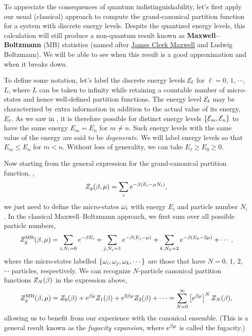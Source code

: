 To appreciate the consequences of quantum indistinguishability, let's first apply our usual (classical) approach to compute the grand-canonical partition function for a system with discrete energy levels.
Despite the quantized energy levels, this calculation will still produce a non-quantum result known as \textbf{Maxwell--Boltzmann} (MB) statistics (named after \href{https://en.wikipedia.org/wiki/James_Clerk_Maxwell}{James Clerk Maxwell} and Ludwig Boltzmann).
We will be able to see when this result is a good approximation and when it breaks down.

To define some notation, let's label the discrete energy levels $\mathcal E_{\ell}$ for $\ell = 0$, $1$, $\cdots$, $L$, where $L$ can be taken to infinity while retaining a countable number of micro-states and hence well-defined partition functions.
The energy level $\mathcal E_{\ell}$ may be characterized by extra information in addition to the actual value of its energy, $E_{\ell}$.
As we saw in , it is therefore possible for distinct energy levels $\left\{\mathcal E_m, \mathcal E_n\right\}$ to have the same energy $E_m = E_n$ for $m \neq n$.
Such energy levels with the same value of the energy are said to be \textit{degenerate}.
We will label energy levels so that $E_m \leq E_n$ for $m < n$.
Without loss of generality, we can take $E_{\ell} \geq E_0 \geq 0$.

Now starting from the general expression for the grand-canonical partition function, ,
\begin{equation*}
  Z_g(\beta, \mu) = \sum_i e^{-\beta (E_i - \mu N_i)},
\end{equation*}
we just need to define the micro-states $\omega_i$ with energy $E_i$ and particle number $N_i$.
In the classical Maxwell--Boltzmann approach, we first sum over all possible particle numbers,
\begin{equation*}
  Z_g^{\text{MB}}(\beta, \mu) = \sum_{i, N_i = 0} e^{-\beta E_i} + \sum_{j, N_j = 1} e^{-\beta (E_j - \mu)} + \sum_{k, N_k = 2} e^{-\beta (E_k - 2\mu)} + \cdots,
\end{equation*}
where the micro-states labelled $\left\{\omega_i, \omega_j, \omega_k, \cdots\right\}$ are those that have $N = 0$, $1$, $2$, $\cdots$ particles, respectively.
We can recognize $N$-particle canonical partition functions $Z_N(\beta)$ in the expression above,
\begin{equation}
  \label{eq:fugacity_exp}
  Z_g^{\text{MB}}(\beta, \mu) = Z_0(\beta) + e^{\beta\mu} Z_1(\beta) + e^{2\beta\mu} Z_2(\beta) + \cdots = \sum_{N = 0}^{\infty} \left[e^{\beta\mu}\right]^N Z_N(\beta),
\end{equation}
allowing us to benefit from our experience with the canonical ensemble.
(This is a general result known as the \textit{fugacity expansion}, where $e^{\beta\mu}$ is called the fugacity.)

